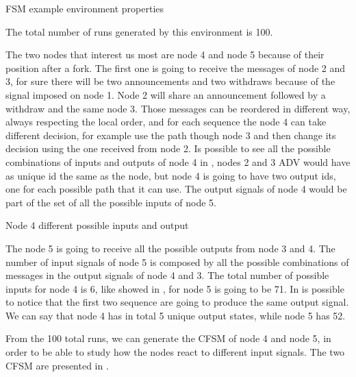 \begin{table}[h]
	
	\caption{FSM example environment properties}
	\label{tbl:fig_4_example}
\end{table}

The total number of runs generated by this environment is \num{100}.

The two nodes that interest us most are node \num{4} and node \num{5} because of their
position after a fork.
The first one is going to receive the messages of node \num{2} and \num{3}, for
sure there will be two announcements and two withdraws because of the signal
imposed on node 1.
Node \num{2} will share an announcement followed by a withdraw and the same node
\num{3}.
Those messages can be reordered in different way, always respecting the local
order, and for each sequence the node \num{4} can take different decision, for
example use the path though node \num{3} and then change its decision using the
one received from node \num{2}.
Is possible to see all the possible combinations of inputs and outputs of node
\num{4} in , nodes \num{2} and \num{3}
\ac{ADV} would have as unique id the same as the node, but node \num{4} is going
to have two output ids, one for each possible path that it can use.
The output signals of node \num{4} would be part of the set of all the possible
inputs of node \num{5}.

\begin{table}[h]
	
	\caption{Node 4 different possible inputs and output}
	\label{tbl:fig_4_node4_possible_inputs}
\end{table}

The node \num{5} is going to receive all the possible outputs from node \num{3} and
\num{4}.
The number of input signals of node \num{5} is composed by all the possible
combinations of messages in the output signals of node \num{4} and \num{3}.
The total number of possible inputs for node \num{4} is \num{6}, like
showed in , for node \num{5} is going
to be \num{71}.
In  is possible to notice that the
first two sequence are going to produce the same output signal.
We can say that node \num{4} has in total \num{5} unique output states, while
node \num{5} has \num{52}.

From the \num{100} total runs, we can generate the \ac{CFSM} of node \num{4} and
node \num{5}, in order to be able to study how the nodes react to different
input signals.
The two \ac{CFSM} are presented in .


